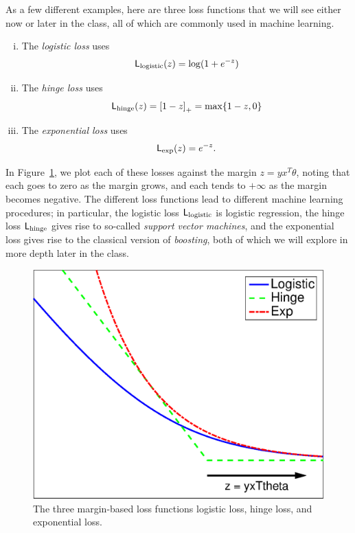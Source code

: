 \documentclass{article}
\begin{document}
As a few different examples, here are three loss functions that
we will see either now or later in the class, all of which are commonly
used in machine learning.
\begin{enumerate}[(i)]
\item The \emph{logistic loss} uses
  \begin{equation*}
    \mathsf{L}_{\rm logistic}(z) = \log(1 + e^{-z})
  \end{equation*}
\item The \emph{hinge loss} uses
  \begin{equation*}
    \mathsf{L}_{\rm hinge}(z) = \left[{1 - z}\right]_+
    = \max\{1 - z, 0\}
  \end{equation*}
\item The \emph{exponential loss} uses
  \begin{equation*}
    \mathsf{L}_{\rm exp}(z) = e^{-z}.
  \end{equation*}
\end{enumerate}
In Figure~\ref{fig:loss-functions}, we plot each of these losses
against the margin $z = y x^T \theta$, noting that each goes to zero
as the margin grows, and each tends to $+\infty$ as the margin becomes
negative. The different loss functions lead to different machine
learning procedures; in particular, the logistic loss
$\mathsf{L}_{\rm logistic}$ is logistic regression, the
hinge loss $\mathsf{L}_{\rm hinge}$ gives rise to so-called \emph{support vector
machines}, and the exponential loss gives rise to the classical
version of \emph{boosting}, both of which we will explore in more depth
later in the class.

\begin{figure}[h!]
  \begin{center}
    \includegraphics[width=.7\columnwidth]{many-losses.eps}
    \caption{\label{fig:loss-functions} The three margin-based loss
      functions logistic loss, hinge loss, and exponential loss.}
  \end{center}
\end{figure}
\end{document}
